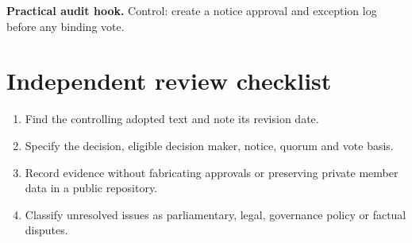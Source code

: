 \documentclass[11pt]{article}
\begin{document}
\textbf{Practical audit hook.} Control: create a notice approval and exception log before any binding vote.

\section{Independent review checklist}
\begin{enumerate}[leftmargin=*,itemsep=4pt]
\item Find the controlling adopted text and note its revision date.
\item Specify the decision, eligible decision maker, notice, quorum and vote basis.
\item Record evidence without fabricating approvals or preserving private member data in a public repository.
\item Classify unresolved issues as parliamentary, legal, governance policy or factual disputes.
\end{enumerate}
\end{document}

